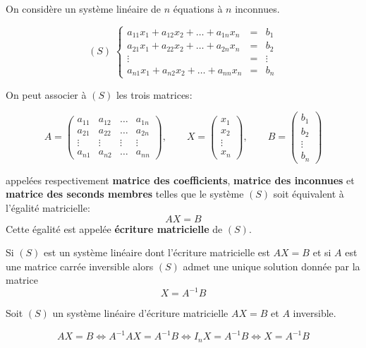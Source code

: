 \documentclass[a4paper]{article}
\begin{document}
\begin{definition}{}{}
	On considère un système linéaire de $n$ équations à $n$ inconnues.

$$(S) \; \left \{
\begin{array}{ccl}
a_{11}x_1+a_{12}x_2+\ldots + a_{1n}x_n &=& b_1 \\
a_{21}x_1+a_{22}x_2+\ldots + a_{2n}x_n &=& b_2 \\
\vdots & = & \vdots \\
a_{n1}x_1+a_{n2}x_2+\ldots + a_{nn}x_n &=& b_n 
\end{array}
\right.$$


On peut associer à $(S)$ les trois matrices:

$$A=\begin{pmatrix}
a_{11} & a_{12} & \ldots & a_{1n} \\
a_{21} & a_{22} & \ldots & a_{2n} \\
\vdots & \vdots & \vdots & \vdots \\
a_{n1} & a_{n2} & \ldots & a_{nn}
\end{pmatrix}, \qquad X=\begin{pmatrix}
x_1 \\
x_2 \\
\vdots \\
x_n
\end{pmatrix}, \qquad B=\begin{pmatrix}
b_1 \\
b_2 \\
\vdots \\
b_n
\end{pmatrix}$$

appelées respectivement \textbf{matrice des coefficients}, \textbf{matrice des inconnues} et \textbf{matrice des seconds membres} telles que le système $(S)$ soit équivalent à l'égalité matricielle: $$AX=B$$
Cette égalité est appelée \textbf{écriture matricielle} de $(S)$.

\end{definition}


\begin{propriete}{}{}
	Si $(S)$ est un système linéaire dont l'écriture matricielle est $AX=B$ et si $A$ est une matrice carrée inversible alors $(S)$ admet une unique solution donnée par la matrice $$X=A^{-1}B$$
\end{propriete}

\begin{demonstration}{}{}
	Soit $(S)$ un système linéaire d'écriture matricielle $AX=B$ et $A$ inversible.

$$AX=B \iff A^{-1}AX=A^{-1}B \iff I_nX=A^{-1}B \iff X=A^{-1}B$$

\end{demonstration}
\bigskip
\end{document}
